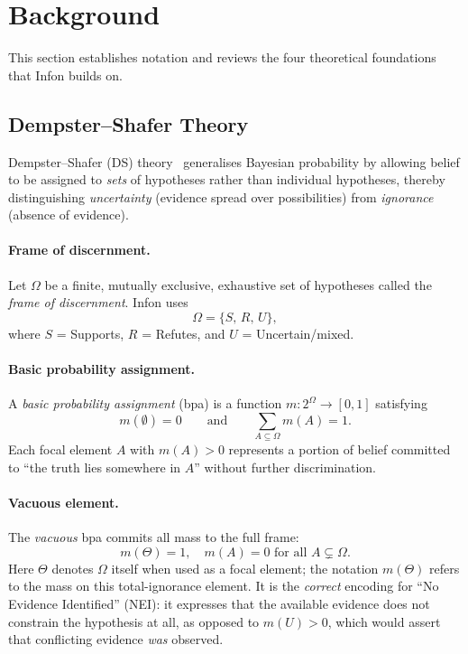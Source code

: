 \section{Background}
\label{sec:background}

This section establishes notation and reviews the four theoretical foundations
that Infon builds on.

\subsection{Dempster--Shafer Theory}
\label{sec:background:ds}

Dempster--Shafer (DS) theory~\cite{dempster1967upper,shafer1976mathematical}
generalises Bayesian probability by allowing belief to be assigned to
\emph{sets} of hypotheses rather than individual hypotheses, thereby
distinguishing \emph{uncertainty} (evidence spread over possibilities) from
\emph{ignorance} (absence of evidence).

\paragraph{Frame of discernment.}
Let $\Omega$ be a finite, mutually exclusive, exhaustive set of hypotheses
called the \emph{frame of discernment}.  Infon uses
\[
  \Omega = \{S,\, R,\, U\},
\]
where $S$ = Supports, $R$ = Refutes, and $U$ = Uncertain/mixed.

\paragraph{Basic probability assignment.}
A \emph{basic probability assignment} (bpa) is a function
$m \colon 2^{\Omega} \to [0,1]$ satisfying
\[
  m(\emptyset) = 0 \qquad \text{and} \qquad \sum_{A \subseteq \Omega} m(A) = 1.
\]
Each focal element $A$ with $m(A) > 0$ represents a portion of belief
committed to ``the truth lies somewhere in $A$'' without further
discrimination.

\paragraph{Vacuous element.}
The \emph{vacuous} bpa commits all mass to the full frame:
\[
  m(\Theta) = 1, \quad m(A) = 0 \text{ for all } A \subsetneq \Omega.
\]
Here $\Theta$ denotes $\Omega$ itself when used as a focal element; the
notation $m(\Theta)$ refers to the mass on this total-ignorance element.
It is the \emph{correct} encoding for ``No Evidence Identified'' (NEI): it
expresses that the available evidence does not constrain the hypothesis at all,
as opposed to $m(U) > 0$, which would assert that conflicting evidence
\emph{was} observed.

